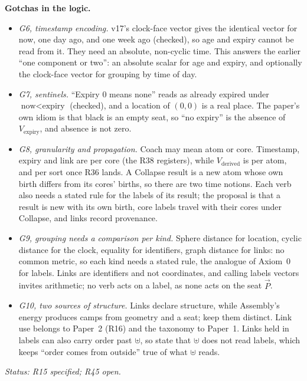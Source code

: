 \documentclass[11pt]{article}
\begin{document}
\textbf{Gotchas in the logic.}
\begin{itemize}
\item \emph{G6, timestamp encoding.} v17's clock-face vector gives the
identical vector for now, one day ago, and one week ago (checked), so age
and expiry cannot be read from it. They need an absolute, non-cyclic
time. This answers the earlier ``one component or two'': an absolute
scalar for age and expiry, and optionally the clock-face vector for
grouping by time of day.
\item \emph{G7, sentinels.} ``Expiry $0$ means none'' reads as already
expired under $\text{now}<\text{expiry}$ (checked), and a location of
$(0,0)$ is a real place. The paper's own idiom is that black is an empty
seat, so ``no expiry'' is the absence of $V_{\text{expiry}}$, and absence
is not zero.
\item \emph{G8, granularity and propagation.} Coach may mean atom or
core. Timestamp, expiry and link are per core (the R38 registers), while
$V_{\text{derived}}$ is per atom, and per sort once R36 lands. A Collapse
result is a new atom whose own birth differs from its cores' births, so
there are two time notions. Each verb also needs a stated rule for the
labels of its result; the proposal is that a result is new with its own
birth, core labels travel with their cores under Collapse, and links
record provenance.
\item \emph{G9, grouping needs a comparison per kind.} Sphere distance
for location, cyclic distance for the clock, equality for identifiers,
graph distance for links: no common metric, so each kind needs a stated
rule, the analogue of Axiom~0 for labels. Links are identifiers and not
coordinates, and calling labels vectors invites arithmetic; no verb acts
on a label, as none acts on the seat $\vec P$.
\item \emph{G10, two sources of structure.} Links declare structure,
while Assembly's energy produces camps from geometry and a seat; keep them
distinct. Link use belongs to Paper~2 (R16) and the taxonomy to Paper~1.
Links held in labels can also carry order past $\uplus$, so state that
$\uplus$ does not read labels, which keeps ``order comes from outside''
true of what $\uplus$ reads.
\end{itemize}
\emph{Status: R15 specified; R45 open.}
\end{document}
